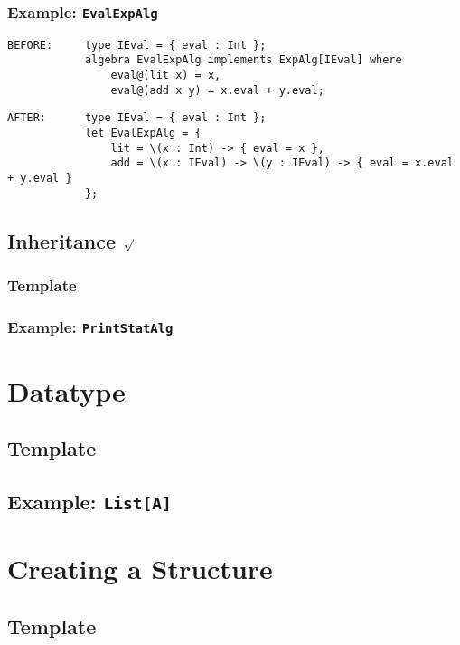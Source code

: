 \documentclass{article}
\begin{document}
\begin{spacing}{1.1}
\subsubsection{Example: \lstinline{EvalExpAlg}}

\begin{lstlisting}[numbers=none]
BEFORE:     type IEval = { eval : Int };
            algebra EvalExpAlg implements ExpAlg[IEval] where
                eval@(lit x) = x,
                eval@(add x y) = x.eval + y.eval;
\end{lstlisting}
\begin{lstlisting}[numbers=none]
AFTER:      type IEval = { eval : Int };
            let EvalExpAlg = {
                lit = \(x : Int) -> { eval = x },
                add = \(x : IEval) -> \(y : IEval) -> { eval = x.eval + y.eval }
            };
\end{lstlisting}

\subsection{Inheritance $\surd$}

\subsubsection{Template}

\subsubsection{Example: \lstinline{PrintStatAlg}}

\section{Datatype}

\subsection{Template}

\subsection{Example: \lstinline{List[A]}}

\section{Creating a Structure}

\subsection{Template}


\end{spacing}
\end{document}
